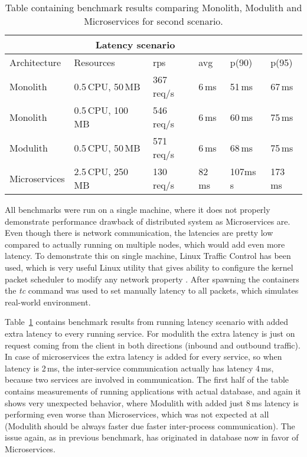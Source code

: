 \label{p:latency_issue}

\begin{table}
    \begin{tabular}{ |p{3cm}||p{3cm}|p{1.5cm}|p{1.5cm}|p{1.5cm}|p{1.5cm}| }
        \hline
        \multicolumn{5}{|c|}{Latency scenario}                                       \\
        \hline
        Architecture  & Resources         & rps        & avg    & p(90)    & p(95)   \\
        \hline
        \rowcolor{Gray}
        Monolith      & 0.5\,CPU, 50\,MB  & 367\,req/s & 6\,ms  & 51\,ms   & 67\,ms  \\
        Monolith      & 0.5\,CPU, 100\,MB & 546\,req/s & 6\,ms  & 60\,ms   & 75\,ms  \\
        \rowcolor{Gray}
        Modulith      & 0.5\,CPU, 50\,MB  & 571\,req/s & 6\,ms  & 68\,ms   & 75\,ms  \\
        Microservices & 2.5\,CPU, 250\,MB & 130\,req/s & 82\,ms & 107ms\,s & 173\,ms \\
        \hline
    \end{tabular}
    \caption{Table containing benchmark results comparing Monolith, Modulith and Microservices for second scenario.\label{table:benchmark_scenario2}}
\end{table}

All benchmarks were run on a single machine, where it does not properly demonstrate performance drawback of distributed system as Microservices are. Even though there is network communication, the latencies are pretty low compared to actually running on multiple nodes, which would add even more latency. To demonstrate this on single machine, Linux Traffic Control has been used, which is very useful Linux utility that gives ability to configure the kernel packet scheduler to modify any network property \cite{MAN_TRAFFIC_CONTROLL}. After spawning the containers the \textit{tc} command was used to set manually latency to all packets, which simulates real-world environment.

Table~\ref{table:benchmark_scenario2} contains benchmark results from running latency scenario with added extra latency to every running service. For modulith the extra latency is just on request coming from the client in both directions (inbound and outbound traffic). In case of microservices the extra latency is added for every service, so when latency is 2\,ms, the inter-service communication actually has latency 4\,ms, because two services are involved in communication. The first half of the table contains measurements of running applications with actual database, and again it shows very unexpected behavior, where Modulith with added just 8\,ms latency is performing even worse than Microservices, which was not expected at all (Modulith should be always faster due faster inter-process communication). The issue again, as in previous benchmark, has originated in database now in favor of Microservices.

